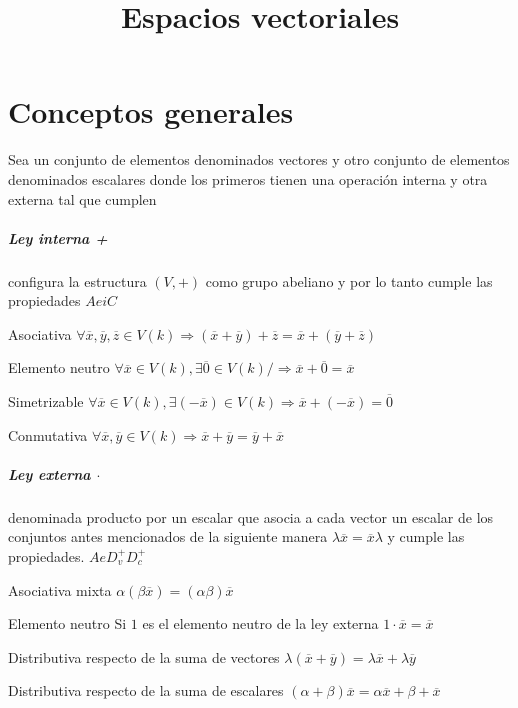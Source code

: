 

\title{Espacios vectoriales}

\renewcommand\vec{\overline}


\maketitle
\tableofcontents
\newpage

\chapter{Conceptos generales}
Sea un conjunto de elementos denominados vectores y otro conjunto de elementos denominados
escalares donde los primeros tienen una operación interna y otra externa tal que cumplen

\paragraph{Ley interna +} configura la estructura $(V,+)$ como grupo abeliano y por lo tanto
cumple las propiedades $AeiC$
\begin{propiedades}
\item Asociativa $\forall\vec{x},\vec{y},\vec{z}\in
	V(k)\Rightarrow(\vec{x}+\vec{y})+\vec{z}=\vec{x}+(\vec{y}+\vec{z})$
\item Elemento neutro $\forall\vec{x}\in V(k), \exists\vec{0}\in V(k) /  \Rightarrow
	\vec{x}+\vec{0}=\vec{x}$
\item Simetrizable $\forall \vec{x}\in V(k), \exists(-\vec{x})\in V(k) \Rightarrow
	\vec{x}+(-\vec{x})=\vec{0}$
\item Conmutativa $\forall\vec{x},\vec{y}\in V(k)\Rightarrow\vec{x}+\vec{y}=\vec{y}+\vec{x}$
\end{propiedades}

\paragraph{Ley externa $\cdot$} denominada producto por un escalar que asocia a cada vector un
escalar de los conjuntos antes mencionados de la siguiente manera $\lambda\vec{x}=\vec{x}\lambda$
y cumple las propiedades. $AeD^+_vD^+_c$

\begin{propiedades}
\item Asociativa mixta $\alpha(\beta\vec{x})=(\alpha\beta)\vec{x}$
\item Elemento neutro Si $1$ es el elemento neutro de la ley externa $1\cdot\vec{x}=\vec{x}$
\item Distributiva respecto de la suma de vectores
	$\lambda(\vec{x}+\vec{y})=\lambda\vec{x}+\lambda\vec{y}$
\item Distributiva respecto de la suma de escalares
	$(\alpha+\beta)\vec{x}=\alpha\vec{x}+\beta+\vec{x}$
\end{propiedades}

